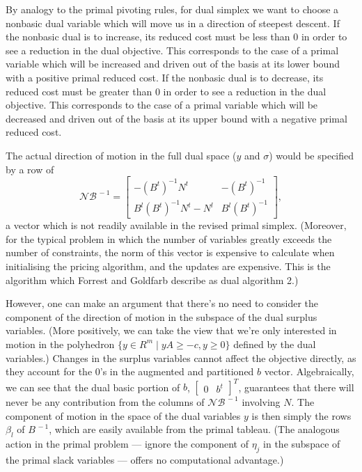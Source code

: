 By analogy to the primal pivoting rules, for dual simplex
we want to choose a nonbasic dual variable which will move us in a direction
of steepest descent.
If the nonbasic dual is to increase, its reduced cost must be less than 0 in
order to see a reduction in the dual objective.
This corresponds to the case of a primal variable which will be increased and
driven out of the basis at its lower bound with a positive primal reduced
cost.
If the nonbasic dual is to decrease, its reduced cost must be greater than
0 in order to see a reduction in the dual objective.
This corresponds to the case of a primal variable which will be decreased and
driven out of the basis at its upper bound with a negative primal reduced cost.

The actual direction of motion in the full dual space ($y$ and $\sigma$) would
be specified by a row of
\begin{equation*}
\mathcal{NB}^{\,-1} = \begin{bmatrix}
			-(B^t)^{-1} N^t & -(B^t)^{-1} \\
			B^l(B^t)^{-1} N^t - N^l & B^l(B^t)^{-1}
		      \end{bmatrix},
\end{equation*}
a vector which is not readily available in the revised
primal simplex.
(Moreover, for the typical problem in which the number of variables greatly
exceeds the number of constraints, the norm of this vector is expensive to
calculate when initialising the pricing algorithm, and the updates are
expensive.
This is the algorithm which Forrest and Goldfarb describe
as dual algorithm 2.)

However, one can make an argument that there's no need to consider the
component of the direction of motion in the subspace of the dual surplus
variables.
(More positively, we can take the view that we're only interested in motion
in the polyhedron $\{y \in R^m \mid yA \geq -c, y \geq 0\}$ defined by the
dual variables.)
Changes in the surplus variables cannot affect the objective directly, as
they account for the 0's in the augmented and partitioned $b$ vector.
Algebraically, we can see that the dual basic portion
of $b$, $\begin{bmatrix}0 & b^t \end{bmatrix}^T$, guarantees that there will
never be any contribution from the columns
of $\mathcal{NB}^{\,-1}$ involving $N$.
The component of motion in the space of the dual variables $y$ is then simply
the rows $\beta_l$ of $B^{\,-1}$, which are easily available from the primal
tableau.
(The analogous action in the primal problem --- ignore the component of
$\eta_j$ in the subspace of the primal slack variables --- offers no
computational advantage.)

